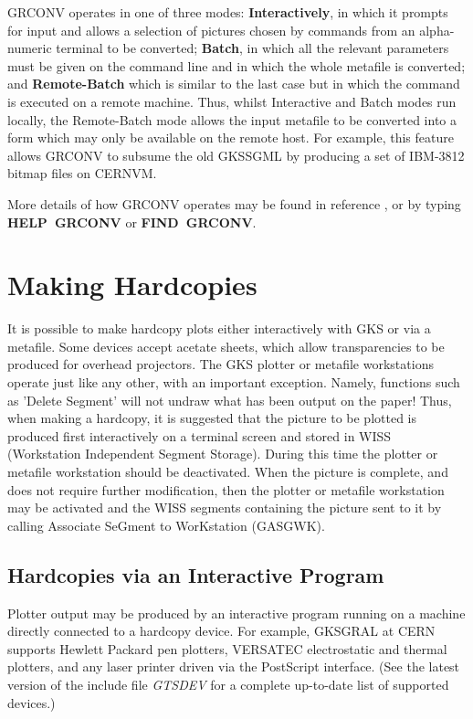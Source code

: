 GRCONV operates in one of three modes: {\bf Interactively}, in which it
prompts for input and allows a selection of pictures chosen by commands from
an alpha-numeric terminal to be converted; {\bf Batch}, in which all the
relevant parameters must be given on the command line and in which the whole
metafile is converted; and {\bf Remote-Batch} which is similar to the
last case but in which the command is executed on a remote machine.
Thus, whilst Interactive and Batch modes run locally, the
Remote-Batch mode allows the input metafile to be converted into a form
which may only be available on the remote host. For example, this feature
allows GRCONV to subsume the old GKSSGML by producing a set of IBM-3812
bitmap files on CERNVM.
 
More details of how GRCONV operates may be found in reference
\cite{bib-grref}, or by typing {\bf HELP~GRCONV} or
{\bf FIND~GRCONV}.
\chapter{\protect\label{sec:hcopy}Making Hardcopies}
 
It is possible to make hardcopy plots either interactively with GKS or via
a metafile. Some devices accept acetate sheets, which allow transparencies
to be produced for overhead projectors.
The GKS plotter or metafile workstations operate just like any other,
with an important exception. Namely, functions such as 'Delete Segment'
will not undraw what has been output on the paper!
Thus, when making a hardcopy, it is suggested that the picture to be plotted
is produced first interactively on a terminal screen and stored in
WISS (Workstation Independent Segment Storage). During this time
the plotter or metafile workstation should be deactivated.
When the picture is complete, and does not require further modification,
then the plotter or metafile workstation may be activated and the
WISS segments containing the picture sent to it by calling
Associate SeGment to WorKstation (GASGWK).
\section{Hardcopies via an Interactive Program}
 
Plotter output may be produced by an interactive program running on a
machine directly connected to a hardcopy device.
For example, GKSGRAL at CERN supports Hewlett Packard pen plotters,
VERSATEC electrostatic and thermal plotters, and any laser printer
driven via the PostScript interface. (See the latest version of the
include file {\it GTSDEV} for a complete up-to-date
list of supported devices.)
 
